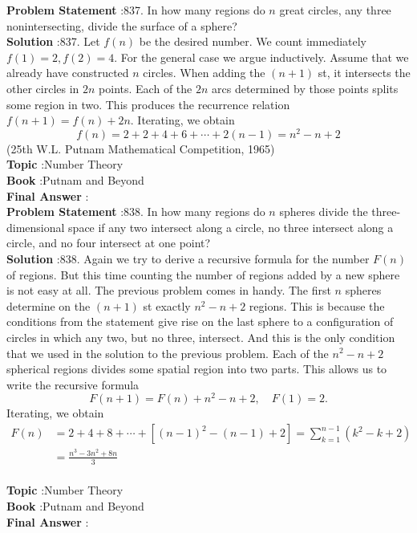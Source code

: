 \documentclass[10pt]{article}
\begin{document}
\textbf{Problem Statement} :837. In how many regions do $n$ great circles, any three nonintersecting, divide the surface of a sphere?\\
\textbf{Solution} :837. Let $f(n)$ be the desired number. We count immediately $f(1)=2, f(2)=4$. For the general case we argue inductively. Assume that we already have constructed $n$ circles. When adding the $(n+1)$ st, it intersects the other circles in $2 n$ points. Each of the $2 n$ arcs determined by those points splits some region in two. This produces the recurrence relation $f(n+1)=f(n)+2 n$. Iterating, we obtain$$ f(n)=2+2+4+6+\cdots+2(n-1)=n^{2}-n+2 $$(25th W.L. Putnam Mathematical Competition, 1965)\\
\textbf{Topic} :Number Theory\\
\textbf{Book} :Putnam and Beyond\\
\textbf{Final Answer} :\\


\textbf{Problem Statement} :838. In how many regions do $n$ spheres divide the three-dimensional space if any two intersect along a circle, no three intersect along a circle, and no four intersect at one point?\\
\textbf{Solution} :838. Again we try to derive a recursive formula for the number $F(n)$ of regions. But this time counting the number of regions added by a new sphere is not easy at all. The previous problem comes in handy. The first $n$ spheres determine on the $(n+1)$ st exactly $n^{2}-n+2$ regions. This is because the conditions from the statement give rise on the last sphere to a configuration of circles in which any two, but no three, intersect. And this is the only condition that we used in the solution to the previous problem. Each of the $n^{2}-n+2$ spherical regions divides some spatial region into two parts. This allows us to write the recursive formula$$ F(n+1)=F(n)+n^{2}-n+2, \quad F(1)=2 . $$Iterating, we obtain$$ \begin{aligned} F(n) &=2+4+8+\cdots+\left[(n-1)^{2}-(n-1)+2\right]=\sum_{k=1}^{n-1}\left(k^{2}-k+2\right) \\ &=\frac{n^{3}-3 n^{2}+8 n}{3} \end{aligned} $$\\
\textbf{Topic} :Number Theory\\
\textbf{Book} :Putnam and Beyond\\
\textbf{Final Answer} :\\
\end{document}
